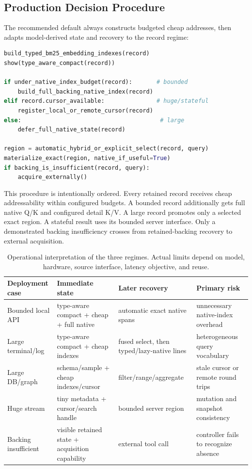 \documentclass[11pt]{article}
\begin{document}
\begin{samepage}
\section{Production Decision Procedure}

The recommended default always constructs budgeted cheap addresses, then
adapts model-derived state and recovery to the record regime:
\begin{lstlisting}[language=Python]
build_typed_bm25_embedding_indexes(record)
show(type_aware_compact(record))

if under_native_index_budget(record):       # bounded
    build_full_backing_native_index(record)
elif record.cursor_available:               # huge/stateful
    register_local_or_remote_cursor(record)
else:                                        # large
    defer_full_native_state(record)

region = automatic_hybrid_or_explicit_select(record, query)
materialize_exact(region, native_if_useful=True)
if backing_is_insufficient(record, query):
    acquire_externally()
\end{lstlisting}
\end{samepage}
This procedure is intentionally ordered. Every retained record receives cheap
addressability within configured budgets. A bounded record additionally gets
full native Q/K and configured detail K/V. A large record promotes only a
selected exact region. A stateful result uses its bounded server interface.
Only a demonstrated backing insufficiency crosses from retained-backing
recovery to external acquisition.

\begin{table}[H]
\centering
\small
\begin{tabularx}{\linewidth}{@{}lXXX@{}}
\toprule
Deployment case & Immediate state & Later recovery & Primary risk\\
\midrule
Bounded local API & type-aware compact + cheap + full native & automatic exact native spans & unnecessary native-index overhead\\
Large terminal/log & type-aware compact + cheap indexes & fused select, then typed/lazy-native lines & heterogeneous query vocabulary\\
Large DB/graph & schema/sample + cheap indexes/cursor & filter/range/aggregate & stale cursor or remote round trips\\
Huge stream & tiny metadata + cursor/search handle & bounded server region & mutation and snapshot consistency\\
Backing insufficient & visible retained state + acquisition capability & external tool call & controller fails to recognize absence\\
\bottomrule
\end{tabularx}
\caption{Operational interpretation of the three regimes. Actual limits depend
on model, hardware, source interface, latency objective, and reuse.}
\label{tab:production-cases}
\end{table}
\end{document}
